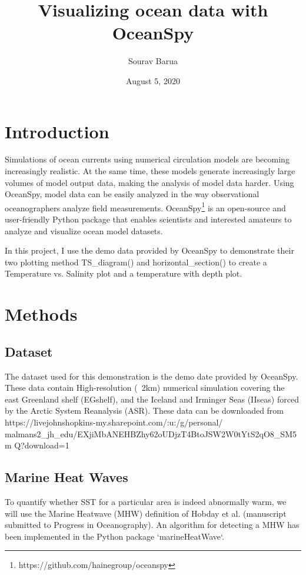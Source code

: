 \documentclass[12pt, letterpaper]{article}
\title{Visualizing ocean data with OceanSpy}
\author{Sourav Barua}
\date{August 5, 2020}
\begin{document}
\maketitle

\section{Introduction}
Simulations of ocean currents using numerical circulation models are becoming increasingly realistic. At the same time, these models generate increasingly large volumes of model output data, making the analysis of model data harder. Using OceanSpy, model data can be easily analyzed in the way observational oceanographers analyze field measurements.  OceanSpy\footnote{https://github.com/hainegroup/oceanspy} is an open-source and user-friendly Python package that enables scientists and interested amateurs to analyze and visualize ocean model datasets.

In this project, I use the demo data provided by OceanSpy to demonstrate their two plotting method TS\_diagram() and horizontal\_section() to create a Temperature vs. Salinity plot and a temperature with depth plot. 
 


\section{Methods}

\subsection{Dataset}
The dataset used for this demonstration is the demo date provided by OceanSpy. These data contain High-resolution (~2km) numerical simulation covering the east Greenland shelf (EGshelf), and the Iceland and Irminger Seas (IIseas) forced by the Arctic System Reanalysis (ASR). These data can be downloaded from https://livejohnshopkins-my.sharepoint.com/:u:/g/personal/
malmans2\_jh\_edu/EXjiMbANEHBZhy62oUDjzT4BtoJSW2W0tYtS2qO8\_SM5m
Q?download=1



\subsection{Marine Heat Waves}

To quantify whether SST for a particular area is indeed abnormally warm, we will use the Marine Heatwave (MHW) definition of Hobday et al. (manuscript submitted to Progress in Oceanography).  An algorithm for detecting a MHW has been implemented in the Python package `marineHeatWave`.
\end{document}
